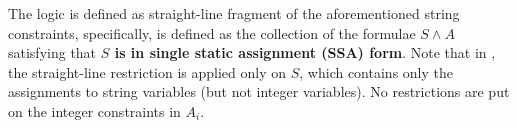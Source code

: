 \documentclass{llncs}
\begin{document}
The logic {\slint} is defined as straight-line fragment of the aforementioned string constraints, specifically, {\slint} is defined as the collection of the formulae $S \wedge A$ satisfying that {\bf $S$ is in single static assignment (SSA) form}.  Note that in {\slint}, the straight-line restriction is applied only on $S$, which contains only the assignments to string variables (but not integer variables). No restrictions are put on the integer constraints in $A_i$.
%
%
\end{document}
